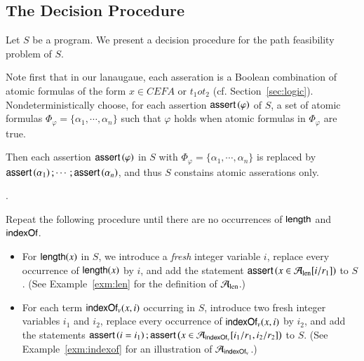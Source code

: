 \subsection{The Decision Procedure}
%
Let $S$  be a {\slint} program. %
We present a decision procedure for the path feasibility problem of $S$. %
%


\medskip
{}%

\smallskip
Note first that in our lanaugaue, each asseration is a Boolean combination of atomic formulas of the form $x\in CEFA$ or $t_1o t_2$ (cf. Section~\ref{sec:logic}).  
Nondeterministically choose, for each assertion $\textsf{assert}\left(\varphi\right)$ of $S$, a set of atomic formulas $\Phi_\varphi = \{\alpha_1,\cdots,\alpha_n\}$ such that $\varphi$ holds when atomic formulas in $\Phi_\varphi$ are true.  %

Then each assertion $\textsf{assert}\left(\varphi\right)$ in $S$ with $\Phi_\varphi = \{\alpha_1,\cdots,\alpha_n\}$ is replaced by $\textsf{assert}\left(\alpha_1\right); \cdots; \textsf{assert}\left(\alpha_n\right)$, and thus $S$ constains atomic asserations only. 

\medskip
{}.

\smallskip

Repeat the following procedure until there are no occurrences of $\mathsf{length}$ and $\mathsf{indexOf}$.
\begin{itemize}
\item For  $\mathsf{length}(x)$ in $S$, we introduce a \emph{fresh} integer variable $i$, replace every occurrence of $\mathsf{length}(x)$ by $i$, and add the statement $\textsf{assert}\left(x \in \mathcal{A}_{\rm len}[i/r_1]\right)$ to $S$. (See Example~\ref{exm:len} for the definition of $\mathcal{A}_{\rm len}$.)  
%
\item 
For each term $\mathsf{indexOf}_v(x, i)$ occurring in $S$, introduce two fresh integer variables $i_1$ and $i_2$, replace every occurrence of $\mathsf{indexOf}_v(x, i)$ by $i_2$, and add the statements $\textsf{assert}\left(i=i_1\right); \textsf{assert}\left(x \in \mathcal{A}_{\mathsf{indexOf}_v}[i_1/r_1, i_2/r_2]\right)$ to $S$.  (See Example~\ref{exm:indexof} for an illustration of $\mathcal{A}_{\rm \mathsf{indexOf}_v}$.)
\end{itemize}
%

